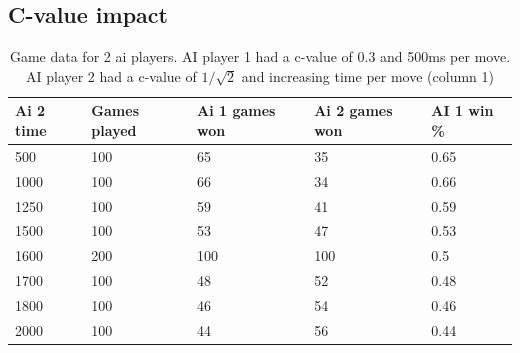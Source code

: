 \documentclass[
11pt, %
english, %
singlespacing, %
headsepline, %
]{MastersDoctoralThesis} %
\begin{document}
\begin{appendices}
\subsection{C-value impact}
\begin{table}[H]
	\centering
\begin{tabular}{|l||l|l|l|l|}
	\hline
	Ai 2 time & Games played & Ai 1 games won & Ai 2 games won & AI 1 win \% \\ \hline \hline
	500       & 100          & 65             & 35             & 0.65        \\ \hline
	1000       & 100          & 66             & 34             & 0.66        \\ \hline
	1250       & 100          & 59             & 41             & 0.59        \\ \hline
	1500       & 100          & 53             & 47             & 0.53        \\ \hline
	1600       & 200          & 100            & 100            & 0.5         \\ \hline
	1700       & 100          & 48             & 52             & 0.48        \\ \hline
	1800       & 100          & 46             & 54             & 0.46        \\ \hline
	2000       & 100          & 44             & 56             & 0.44        \\ \hline
\end{tabular}
	\caption{Game data for 2 ai players. AI player 1 had a c-value of 0.3 and 500ms per move. AI player 2 had a c-value of $1/\sqrt{2}$ and increasing time per move (column 1)}
	\label{table:fourinarow-significance}
\end{table}


\end{appendices}
\end{document}
